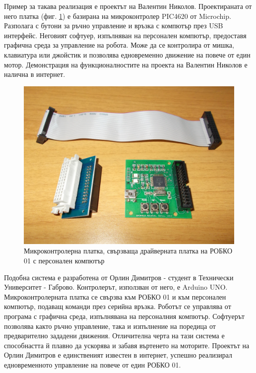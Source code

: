 Пример за такава реализация е проектът на Валентин Николов.
\cite{robko-val_niko}
Проектираната от него платка (фиг. \ref{fig:usb_cntrl}) е базирана на микроконтролер PIC4620 от Microchip. Разполага с бутони за ръчно управление и връзка с компютър през USB интерфейс. Неговият софтуер, изпълняван на персонален компютър, предоставя графична среда за управление на робота. Може да се контролира от мишка, клавиатура или джойстик и позволява едновременно движение на повече от един мотор. Демонстрация на функционалностите на проекта на Валентин Николов е налична в интернет.\cite{robko-usb-gui}
\begin{figure}
    \centering
    \includegraphics[width=\linewidth]{pictures/robko_usb_controller.jpg}
    \caption{Микроконтролерна платка, свързваща драйверната платка на РОБКО 01 с персонален компютър}
    \label{fig:usb_cntrl}
\end{figure}

Подобна система е разработена от Орлин Димитров - студент в Технически Университет - Габрово. Контролерът, използван от него, е Arduino UNO. Микроконтролерната платка се свързва към РОБКО 01 и към персонален компютър, подаващ команди през серийна връзка. Роботът се управлява от програма с графична среда, изпълнявана на персоналния компютър. Софтуерът позволява както ръчно управление, така и изпълнение на поредица от предварително зададени движения. Отличителна черта на тази система е способнастта й плавно да ускорява и забавя въртенето на моторите.
\cite{robko-orlin-fb}
Проектът на Орлин Димитров е единственият известен в интернет, успешно реализирал едновременното управление на повече от един РОБКО 01.
\cite{robko-orlin-double2}


